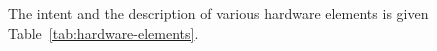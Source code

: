 



The intent and the description of various hardware elements is given Table~\ref{tab:hardware-elements}.

